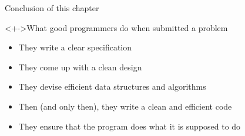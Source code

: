 \begin{frame}[squeeze]{Conclusion of this chapter}
  \begin{block}<+->{What good programmers do when submitted a problem}
    \vspace{-.4\baselineskip}
    \begin{itemize}
    \item They write a clear specification
    \item They come up with a clean design
    \item They devise efficient data structures and algorithms
    \item Then (and only then), they write a clean and efficient code
    \item They ensure that the program does what it is supposed to do
    \end{itemize}
  \end{block}
\end{frame}
